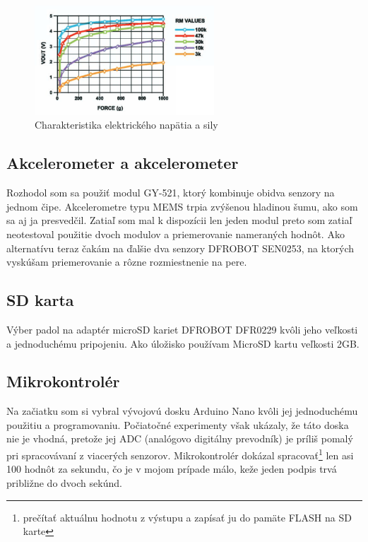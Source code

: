 \begin{figure}[hbt]
	\centering
	\includegraphics[width=0.6\textwidth]{obrazky-figures/fsr-charakteristikaV-force.png}
	\caption{Charakteristika elektrického napätia a sily}
	\label{Characteristics}
\end{figure}

\subsection*{Akcelerometer a akcelerometer}

Rozhodol som sa použiť modul GY-521, ktorý kombinuje obidva senzory na jednom čipe. Akcelerometre typu MEMS trpia zvýšenou hladinou šumu\cite{PawlusJan2019Zpns}, ako som sa aj ja presvedčil. Zatiaľ som mal k dispozícii len jeden modul preto som zatiaľ neotestoval použitie dvoch modulov a priemerovanie nameraných hodnôt. Ako alternatívu teraz čakám na ďalšie dva senzory DFROBOT SEN0253\cite{PohybovySenzor}, na ktorých vyskúšam priemerovanie a rôzne rozmiestnenie na pere.

\subsection*{SD karta}

Výber padol na adaptér microSD kariet DFROBOT DFR0229 kvôli jeho veľkosti a jednoduchému pripojeniu. Ako úložisko používam MicroSD kartu veľkosti 2GB. 

\subsection*{Mikrokontrolér}

Na začiatku som si vybral vývojovú dosku Arduino Nano kvôli jej jednoduchému použitiu a programovaniu. 
Počiatočné experimenty však ukázaly, že táto doska nie je vhodná, pretože jej ADC (analógovo digitálny prevodník) je príliš pomalý pri spracovávaní z viacerých senzorov. Mikrokontrolér dokázal spracovať\footnote{prečítať aktuálnu hodnotu z výstupu a zapísať ju do pamäte FLASH na SD karte} len asi 100 hodnôt za sekundu, čo je v mojom prípade málo, keže jeden podpis trvá približne do dvoch sekúnd.


